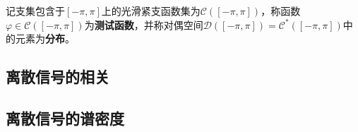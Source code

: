 \begin{definition}[分布]
    记支集包含于$[-\pi,\pi]$上的光滑紧支函数集为$\mathcal{C}([-\pi,\pi])$，称函数$\varphi\in\mathcal{C}([-\pi,\pi])$为\textbf{测试函数}，并称对偶空间$\mathcal{D}([-\pi,\pi])=\mathcal{C}^*([-\pi,\pi])$中的元素为\textbf{分布}。
\end{definition}

\subsection{离散信号的相关}\label{sub:discrete_corr}

\subsection{离散信号的谱密度}\label{sub:discrete_density}